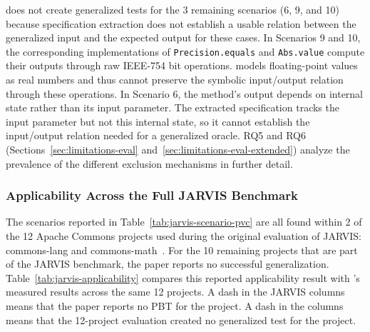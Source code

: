 \ToolTeralizer{} does not create generalized tests for the 3 remaining scenarios (6, 9, and 10)
because specification extraction does not establish a usable relation
between the generalized input and the expected output for these cases.
In Scenarios 9 and 10, the corresponding implementations
of \texttt{Precision.equals} and \texttt{Abs.value}
compute their outputs through raw IEEE-754 bit operations.
\ToolSPF{} models floating-point values as real numbers
and thus cannot preserve the symbolic input/output relation through these operations.
In Scenario 6, the method's output depends on internal state
rather than its input parameter.
The extracted specification tracks the input parameter but not this internal state,
so it cannot establish the input/output relation needed for a generalized oracle.
RQ5 and RQ6 (Sections~\ref{sec:limitations-eval} and~\ref{sec:limitations-eval-extended})
analyze the prevalence of the different exclusion mechanisms in further detail.

\subsubsection{Applicability Across the Full JARVIS Benchmark}%
\label{sec:jarvis-applicability}

The \TzRqzeroTabletwoReportedRows{} scenarios reported in Table~\ref{tab:jarvis-scenario-pvc}
are all found within 2 of the 12 Apache Commons projects
used during the original evaluation of JARVIS:
commons-lang and commons-math~\cite{peleg_2018_jarvis}.
For the 10 remaining projects that are part of the JARVIS benchmark,
the paper reports no successful generalization.
Table~\ref{tab:jarvis-applicability} compares this reported applicability result
with \ToolTeralizer{}'s measured results across the same 12 projects.
A dash in the JARVIS columns means
that the paper reports no PBT for the project.
A dash in the \ToolTeralizer{} columns means
that the 12-project evaluation created no generalized test for the project.




